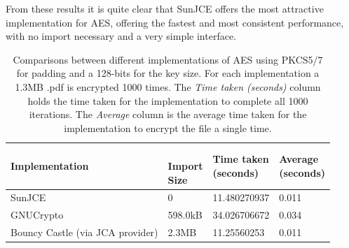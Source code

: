 \documentclass[12pt, titlepage]{article}
\begin{document}
\newline \indent From these results it is quite clear that SunJCE offers the most attractive implementation for AES, offering the fastest and most consistent performance, with no import necessary and a very simple interface.
\begin{center}
\begin{table}[H]
    \begin{tabular}{ | l | l | l | l |}
    \hline
    \textbf{Implementation} & \shortstack{\\ \textbf{Import} \\ \textbf{Size}} & \shortstack{\textbf{Time taken} \\ \textbf{(seconds)}} & \shortstack{\textbf{Average} \\ \textbf{(seconds)}} \\ \hline
    
    SunJCE & 0 & 11.480270937  &  0.011 \\ \hline
    
    GNUCrypto & 598.0kB & 34.026706672  & 0.034 \\ \hline
    
    Bouncy Castle (via JCA provider) & 2.3MB & 11.25560253 & 0.011 \\ \hline
    
    \end{tabular}
    \caption{Comparisons between different implementations of AES using PKCS5/7 for padding and a 128-bits for the key size. For each implementation a 1.3MB .pdf is encrypted 1000 times. The \textit{Time taken (seconds)} column holds the time taken for the implementation to complete all 1000 iterations. The \textit{Average} column is the average time taken for the implementation to encrypt the file a single time.} \label{tab:aes.pdfComparison}
    \end{table}
\end{center}
\end{document}
